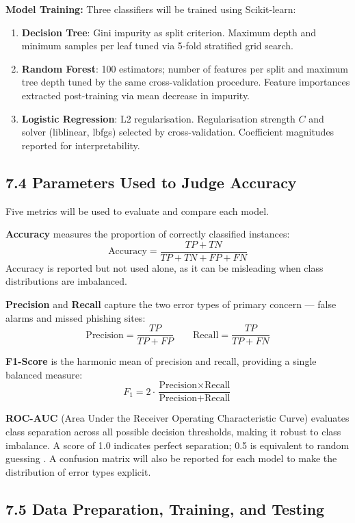 \documentclass[11pt,letterpaper]{article}
\begin{document}
\textbf{Model Training:} Three classifiers will be trained using Scikit-learn:
\begin{enumerate}[leftmargin=1.4cm,label=\arabic*.]
    \item \textbf{Decision Tree}: Gini impurity as split criterion. Maximum depth and minimum samples per leaf tuned via 5-fold stratified grid search.
    \item \textbf{Random Forest}: 100 estimators; number of features per split and maximum tree depth tuned by the same cross-validation procedure. Feature importances extracted post-training via mean decrease in impurity.
    \item \textbf{Logistic Regression}: L2 regularisation. Regularisation strength $C$ and solver (liblinear, lbfgs) selected by cross-validation. Coefficient magnitudes reported for interpretability.
\end{enumerate}

\subsection*{7.4 Parameters Used to Judge Accuracy}

Five metrics will be used to evaluate and compare each model.

\textbf{Accuracy} measures the proportion of correctly classified instances:
\[
\text{Accuracy} = \frac{TP + TN}{TP + TN + FP + FN}
\]
Accuracy is reported but not used alone, as it can be misleading when class distributions are imbalanced.

\textbf{Precision} and \textbf{Recall} capture the two error types of primary concern --- false alarms and missed phishing sites:
\[
\text{Precision} = \frac{TP}{TP + FP} \qquad \text{Recall} = \frac{TP}{TP + FN}
\]

\textbf{F1-Score} is the harmonic mean of precision and recall, providing a single balanced measure:
\[
F_1 = 2 \cdot \frac{\text{Precision} \times \text{Recall}}{\text{Precision} + \text{Recall}}
\]

\textbf{ROC-AUC} (Area Under the Receiver Operating Characteristic Curve) evaluates class separation across all possible decision thresholds, making it robust to class imbalance. A score of 1.0 indicates perfect separation; 0.5 is equivalent to random guessing \cite{fawcett2006}. A confusion matrix will also be reported for each model to make the distribution of error types explicit.

\subsection*{7.5 Data Preparation, Training, and Testing}
\end{document}
